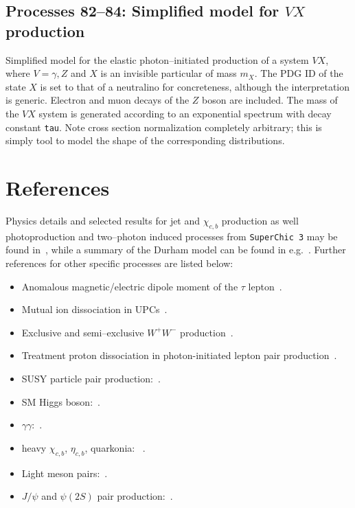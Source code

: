 \documentclass[12pt]{article}
\begin{document}
\subsection{Processes 82--84: Simplified model for $VX$ production}

Simplified model for the elastic photon--initiated production of a system $VX$, where $V=\gamma,Z$ and $X$ is an invisible particular of mass $m_X$. The PDG 
ID of the state $X$ is set to that of a neutralino for concreteness, although the interpretation is generic. Electron and muon decays of the $Z$ boson are 
included. The mass of the $VX$ system is generated according to an exponential spectrum with decay constant \texttt{tau}. Note cross section normalization 
completely arbitrary; this is simply tool to model the shape of the corresponding distributions.

\section{References}\label{sec:ref}



Physics details and selected results for jet and $\chi_{c,b}$ production as well photoproduction and two--photon induced processes from \texttt{SuperChic 3} 
may be found in~\cite{Harland-Lang:2015cta}, while a summary of the Durham model can be found in e.g.~\cite{Harland-Lang:2014dta,Harland-Lang:2014lxa,Harland-Lang:2015eqa}. 
Further references for other specific processes are listed below:
\begin{itemize}
\item Anomalous magnetic/electric dipole moment of the $\tau$ lepton~\cite{Harland-Lang:2024zpn}.
\item Mutual ion dissociation in UPCs~\cite{Harland-Langiondiss}.
\item Exclusive and semi--exclusive $W^+ W^-$ production~\cite{Bailey:2022wqy}.
\item Treatment proton dissociation in photon-initiated lepton pair production~\cite{Harland-Lang:2020veo}.
\item SUSY particle pair production:~\cite{Harland-Lang:2018hmi}.
\item SM Higgs boson:~\cite{HarlandLang:2013jf}.
\item $\gamma\gamma$:~\cite{HarlandLang:2010ep,HarlandLang:2012qz}.
\item heavy $\chi_{c,b}$, $\eta_{c,b}$, quarkonia: ~\cite{HarlandLang:2009qe,HarlandLang:2010ep,HarlandLang:2010ys}. 
\item Light meson pairs:~\cite{HarlandLang:2011qd,Harland-Lang:2013ncy,Harland-Lang:2013qia}.
\item $J/\psi$ and $\psi(2S)$ pair production:~\cite{Harland-Lang:2014efa}.
\end{itemize}
\end{document}
